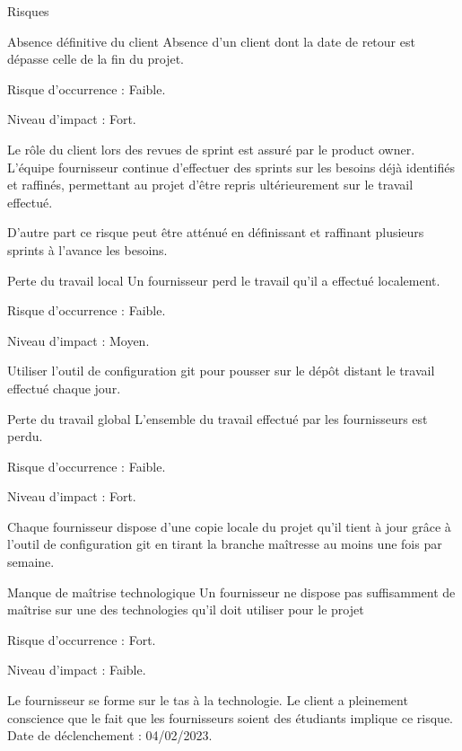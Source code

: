\documentclass[]{article}
\begin{document}
{\begin{section}{Risques}
 \newpage

 \begin{subsection}{Absence définitive du client}
     Absence d'un client dont la date de retour est dépasse celle de la fin du projet.

     Risque d’occurrence : Faible.

     Niveau d’impact : Fort.

     Le rôle du client lors des revues de sprint est assuré par le product owner. L'équipe fournisseur continue d'effectuer des sprints sur les besoins déjà identifiés et raffinés, permettant au projet d'être repris ultérieurement sur le travail effectué.

     D'autre part ce risque peut être atténué en définissant et raffinant plusieurs sprints à l'avance les besoins.
 \end{subsection}

 \begin{subsection}{Perte du travail local}
     Un fournisseur perd le travail qu'il a effectué localement.

     Risque d’occurrence : Faible.

     Niveau d’impact : Moyen.

     Utiliser l'outil de configuration git pour pousser sur le dépôt distant le travail effectué chaque jour.
 \end{subsection}

 \begin{subsection}{Perte du travail global}
     L'ensemble du travail effectué par les fournisseurs est perdu.

     Risque d’occurrence : Faible.

     Niveau d’impact : Fort.

     Chaque fournisseur dispose d'une copie locale du projet qu'il tient à jour grâce à l'outil de configuration git en tirant la branche maîtresse au moins une fois par semaine.
 \end{subsection}

 \newpage

 \begin{subsection}{Manque de maîtrise technologique}
     Un fournisseur ne dispose pas suffisamment de maîtrise sur une des technologies qu'il doit utiliser pour le projet

     Risque d’occurrence : Fort.

     Niveau d’impact : Faible.

     Le fournisseur se forme sur le tas à la technologie. Le client a pleinement conscience que le fait que les fournisseurs soient des étudiants implique ce risque.
     \\[5mm]
     Date de déclenchement : 04/02/2023.


\end{subsection}
\end{section}}
\end{document}
